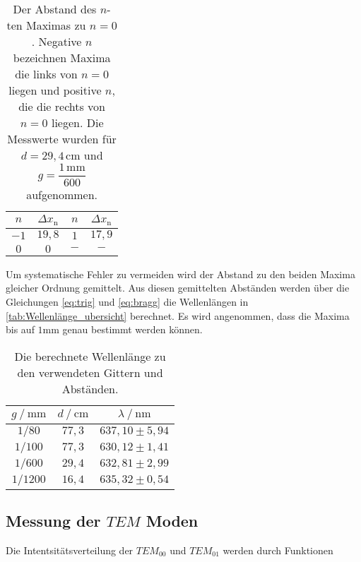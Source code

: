 \begin{table}[H]
    \centering
    \caption{Der Abstand des $n$-ten Maximas zu $n = 0$. Negative $n$ bezeichnen Maxima die links von $n = 0$ liegen und positive $n$, die die rechts von $n = 0$ liegen. Die Messwerte wurden für $d = 29,4 \, \unit{\centi\meter}$ und $g = \dfrac{1 \, \unit{\milli\meter}}{600}$ aufgenommen.}
    \label{tab:Well_1600}
    \begin{tabular}{c c c c}
    \toprule
     $n$ & $\Delta x_\text{n}$ &   $n$ & $\Delta x_\text{n}$\\
    \midrule
    $-1$ & $19,8$   & $1$ & $ 17,9$   \\
    $0$  & $0   $   & $-$ & $ -   $   \\
    \bottomrule
    \end{tabular}
    \end{table}

Um systematische Fehler zu vermeiden wird der Abstand zu den beiden Maxima gleicher Ordnung gemittelt. 
Aus diesen gemittelten Abständen werden über die Gleichungen \eqref{eq:trig} und \eqref{eq:bragg} die Wellenlängen in \autoref{tab:Wellenlänge_ubersicht} berechnet. 
Es wird angenommen, dass die Maxima bis auf $1 \unit{\milli\meter}$ genau bestimmt werden können.

\begin{table}[H]
    \centering
    \caption{Die berechnete Wellenlänge zu den verwendeten Gittern und Abständen.}
    \label{tab:Wellenlänge_ubersicht}
    \begin{tabular}{c c c}
    \toprule
     $g \mathbin{/} \unit{\milli\meter}$ & $d \mathbin{/} \unit{\centi\meter}$ &$\lambda \mathbin{/} \unit{\nano\meter}$ \\
    \midrule
    $1/80  $   & $77,3$   & $637,10 \pm 5,94$\\
    $1/100 $   & $77,3$   & $630,12 \pm 1,41$\\
    $1/600 $   & $29,4$   & $632,81 \pm 2,99$\\
    $1/1200$   & $16,4$   & $635,32 \pm 0,54$\\
    \bottomrule
    \end{tabular}
    \end{table}

\subsection{Messung der $TEM$ Moden}
\label{sec:TEM_moden}

Die Intentsitätsverteilung der $TEM_{00}$ und $TEM_{01}$  werden durch Funktionen 

